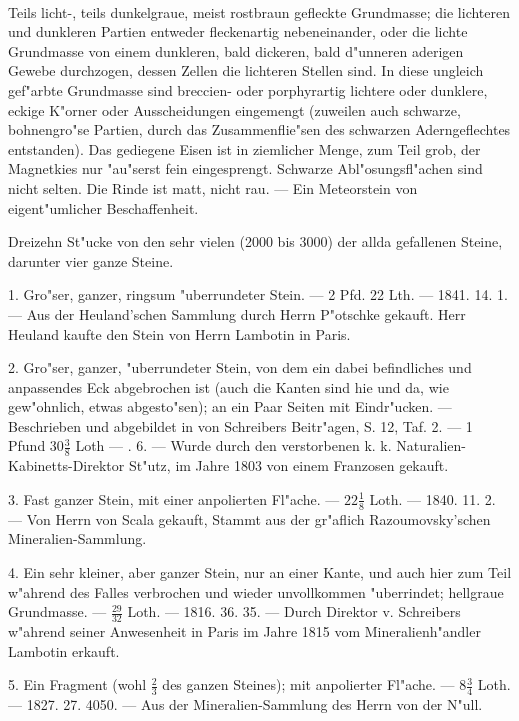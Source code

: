 \documentclass[a4paper, 11pt, oneside, polutonikogreek, german]{article}
\begin{document}
\paragraph{}
Teils licht-, teils dunkelgraue, meist rostbraun gefleckte Grundmasse; die lichteren und dunkleren Partien entweder fleckenartig nebeneinander, oder die lichte Grundmasse von einem dunkleren, bald dickeren, bald d"unneren aderigen Gewebe durchzogen, dessen Zellen die lichteren Stellen sind. In diese ungleich gef"arbte Grundmasse sind breccien- oder porphyrartig lichtere oder dunklere, eckige K"orner oder Ausscheidungen eingemengt (zuweilen auch schwarze, bohnengro"se Partien, durch das Zusammenflie"sen des schwarzen Aderngeflechtes entstanden). Das gediegene Eisen ist in ziemlicher Menge, zum Teil grob, der Magnetkies nur "au"serst fein eingesprengt. Schwarze Abl"osungsfl"achen sind nicht selten. Die Rinde ist matt, nicht rau. --- Ein Meteorstein von eigent"umlicher Beschaffenheit.

Dreizehn St"ucke von den sehr vielen (2000 bis 3000) der allda gefallenen Steine, darunter vier ganze Steine.

1. Gro"ser, ganzer, ringsum "uberrundeter Stein. --- 2 Pfd. 22 Lth. --- 1841. 14. 1. --- Aus der Heuland'schen Sammlung durch Herrn P"otschke gekauft. Herr Heuland kaufte den Stein von Herrn Lambotin in Paris.

2. Gro"ser, ganzer, "uberrundeter Stein, von dem ein dabei befindliches und anpassendes Eck abgebrochen ist (auch die Kanten sind hie und da, wie gew"ohnlich, etwas abgesto"sen); an ein Paar Seiten mit Eindr"ucken. --- Beschrieben und abgebildet in von Schreibers Beitr"agen, S. 12, Taf. 2. --- 1 Pfund $30\frac{3}{8}$ Loth --- . 6. --- Wurde durch den verstorbenen k. k. Naturalien-Kabinetts-Direktor St"utz, im Jahre 1803 von einem Franzosen gekauft.

3. Fast ganzer Stein, mit einer anpolierten Fl"ache. --- $22\frac{1}{8}$ Loth. --- 1840. 11. 2. --- Von Herrn von Scala gekauft, Stammt aus der gr"aflich Razoumovsky'schen Mineralien-Sammlung.

4. Ein sehr kleiner, aber ganzer Stein, nur an einer Kante, und auch hier zum Teil w"ahrend des Falles verbrochen und wieder unvollkommen "uberrindet; hellgraue Grundmasse. --- $\frac{29}{32}$ Loth. --- 1816. 36. 35. --- Durch Direktor v. Schreibers w"ahrend seiner Anwesenheit in Paris im Jahre 1815 vom Mineralienh"andler Lambotin erkauft.

5. Ein Fragment (wohl $\frac{2}{3}$ des ganzen Steines); mit anpolierter Fl"ache. --- $8\frac{3}{4}$ Loth. --- 1827. 27. 4050. --- Aus der Mineralien-Sammlung des Herrn von der N"ull.
\end{document}
